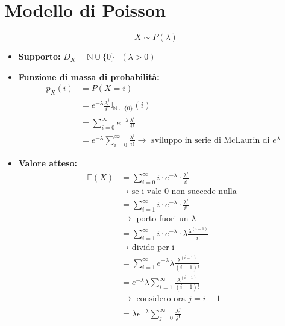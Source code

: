 \documentclass[11pt]{report}
\begin{document}
\section{Modello di Poisson}
\begin{equation}
    X\sim P(\lambda)
\end{equation}
\begin{itemize}
	\item \textbf{Supporto:} $D_X=\mathbb{N} \cup \{0\}\ \ \ (\lambda > 0)$
    \item \textbf{Funzione di massa di probabilità:}
    \begin{equation}
    	\begin{split}
   			p_X(i) & = P(X = i)\\
   			& = e^{-\lambda} \frac{\lambda^i}{i!} \mathbb{I}_{\mathbb{N}\cup\{0\}}(i)\\
            & = \sum_{i=0}^\infty e^{-\lambda} \frac{\lambda^i}{i!}\\
            & = e^{-\lambda} \sum_{i=0}^\infty \frac{\lambda^i}{i!} \rightarrow \text{ sviluppo in serie di McLaurin di } e^\lambda
		\end{split}
    \end{equation}
    \item \textbf{Valore atteso:}
    \begin{equation}
    	\begin{split}
   			\mathbb{E}(X) & = \sum_{i=0}^\infty i \cdot e^{-\lambda} \cdot \frac{\lambda^i}{i!}\\
            & \rightarrow \text{ se i vale 0 non succede nulla }\\
            & = \sum_{i=1}^\infty i \cdot e^{-\lambda} \cdot \frac{\lambda^i}{i!}\\
            & \rightarrow \text{ porto fuori un } \lambda\\
            & = \sum_{i=1}^\infty i \cdot e^{-\lambda} \cdot \lambda \frac{\lambda^{(i-1)}}{i!}\\
            & \rightarrow \text{ divido per i}\\
            & = \sum_{i=1}^\infty e^{-\lambda} \lambda \frac{\lambda^{(i-1)}}{(i-1)!}\\
            & = e^{-\lambda} \lambda \sum_{i=1}^\infty \frac{\lambda^{(i-1)}}{(i-1)!}\\
            & \rightarrow \text{ considero ora } j = i-1\\
            & = \lambda e^{-\lambda} \sum_{j=0}^\infty \frac{\lambda^j}{j!}\\

\end{split}
\end{equation}
\end{itemize}
\end{document}
